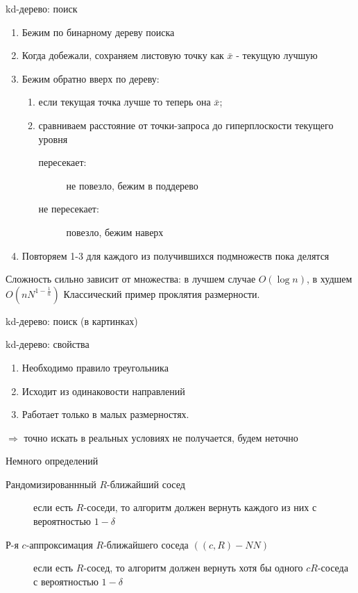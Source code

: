 \documentclass[14pt, fleqn, xcolor={dvipsnames, table}]{beamer}
\begin{document}
\begin{frame}{kd-дерево: поиск}
\begin{enumerate}
  \item Бежим по бинарному дереву поиска
  \item Когда добежали, сохраняем листовую точку как $\bar{x}$ - текущую лучшую
  \item Бежим обратно вверх по дереву:
  \begin{enumerate}
    \item если текущая точка лучше то теперь она $\bar{x}$;
    \item сравниваем расстояние от точки-запроса до гиперплоскости текущего уровня
    \begin{description}
      \item [\color{blue}пересекает:] не повезло, бежим в поддерево
      \item [\color{blue}не пересекает:] повезло, бежим наверх  
    \end{description}
  \end{enumerate}
  \item Повторяем 1-3 для каждого из получившихся подмножеств пока делятся
\end{enumerate}
Сложность сильно зависит от множества: в лучшем случае $O(\log n)$, в худшем $O(nN^{1-\frac{1}{n}})$ Классический пример проклятия размерности.
\end{frame}

\begin{frame}{kd-дерево: поиск (в картинках)}
\begin{center}
\end{center}
\end{frame}

\begin{frame}{kd-дерево: свойства}
\begin{enumerate}
  \item Необходимо правило треугольника
  \item Исходит из одинаковости направлений
  \item Работает только в малых размерностях.
\end{enumerate}
$\Rightarrow$ точно искать в реальных условиях не получается, будем неточно
\end{frame}

\begin{frame}{Немного определений}
\small
\begin{description}
  \item [\color{blue}Рандомизированнный $R$-ближайший сосед] если есть $R$-соседи, то алгоритм должен вернуть каждого из них с вероятностью $1 - \delta$
  \item [\color{blue}Р-я $c$-аппроксимация $R$-ближайшего соседа $((c , R ) - NN )$] если есть $R$-сосед, то алгоритм должен вернуть хотя бы одного $cR$-соседа с вероятностью $1 - \delta$
\end{description}
\end{frame}
\end{document}
